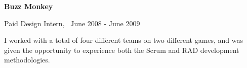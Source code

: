 \documentclass[10pt,letterpaper]{article}
\newenvironment{topic}[1]{
\begin{minipage}[t]{0.15\linewidth}\begin{flushleft}\begin{flushright}\textbf{#1}\end{flushright}\end{flushleft}\end{minipage}\hspace{1em}\vrule\hspace{1em}\begin{minipage}[t]{0.80\linewidth}\begin{flushright}\begin{flushleft}
}{
\end{flushleft}\end{flushright}\end{minipage}\vspace{1em}
}
\begin{document}
\vspace{1.5em}
\begin{topic}{Buzz Monkey}
  Paid Design Intern, \ June 2008 - June 2009

  \vspace{1em}

  I worked with a total of four different teams on two different
  games, and was given the opportunity to experience both the Scrum
  and RAD development methodologies.
\end{topic}
\end{document}
